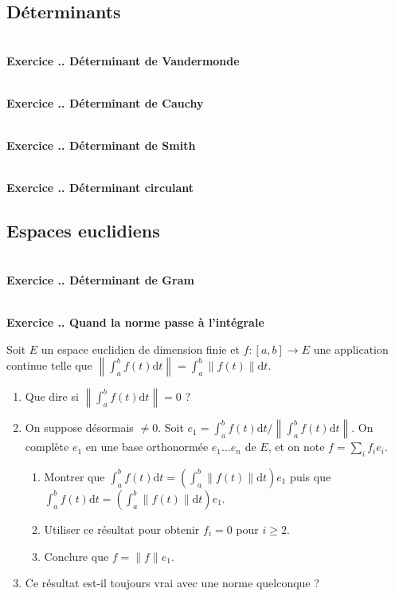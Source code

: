 \documentclass{article}
\newcommand{\di}{\mathrm{d}}
\newcounter{exo}
\newcommand{\exercice}[1][\null]{\textbf{\\ Exercice \thesection.\theexo. #1} \addtocounter{exo}{1}}
\begin{document}
\subsection{Déterminants}

\exercice[Déterminant de Vandermonde]

\exercice[Déterminant de Cauchy]

\exercice[Déterminant de Smith]

\exercice[Déterminant circulant]

\subsection{Espaces euclidiens}

\exercice[Déterminant de Gram]

\exercice[Quand la norme passe à l'intégrale]

Soit $E$ un espace euclidien de dimension finie et $f : [a,b] \rightarrow E$ une application continue telle que $\displaystyle \left\lVert\int_a^b f(t) \di t \right\lVert = \int_a^b \lVert f(t)\lVert \di t$.

\begin{enumerate}

\item Que dire si $\left\lVert\int_a^b f(t) \di t \right\lVert = 0$ ?

\item On suppose désormais $\neq 0$. Soit $e_1 = \int_a^b f(t) \di t \Big/  \left\lVert\int_a^b f(t) \di t \right\lVert $. On complète $e_1$ en une base orthonormée $e_1 \dots e_n$ de $E$, et on note $f = \sum_i f_i e_i$.
\begin{enumerate}

\item Montrer que $\int_a^b f(t) \di t = (\int_a^b \lVert f(t) \rVert \di t) e_1$ puis que $\int_a^b f(t) \di t = (\int_a^b \lVert f(t) \rVert \di t) e_1$.

\item Utiliser ce résultat pour obtenir $f_i = 0$ pour $i \ge 2$.

\item Conclure que $f = \lVert f \lVert e_1$.

\end{enumerate}

\item Ce résultat est-il toujours vrai avec une norme quelconque ?

\end{enumerate}
\end{document}
